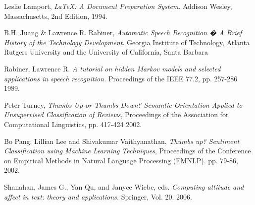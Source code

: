 \documentclass[a4paper,12pt,twoside]{ltxdoc}
\begin{document}
\newpage 

\begin{thebibliography}{9}

  Leslie Lamport,
  \emph{\LaTeX: A Document Preparation System}.
  Addison Wesley, Massachusetts,
  2nd Edition,
  1994.
  
  B.H. Juang \& Lawrence R. Rabiner,
  \emph{Automatic Speech Recognition � A Brief History of the Technology Development}.
  Georgia Institute of Technology, Atlanta
  Rutgers University and the University of California, Santa Barbara
  
Rabiner, Lawrence R.
\emph{A tutorial on hidden Markov models and selected applications in speech recognition.}
Proceedings of the IEEE 77.2,
pp. 257-286
1989.

Peter Turney, 
\emph{Thumbs Up or Thumbs Down? Semantic Orientation Applied to Unsupervised Classification of Reviews},
 Proceedings of the Association for Computational Linguistics,
 pp. 417-424
 2002.

  Bo Pang; Lillian Lee and Shivakumar Vaithyanathan,
  \emph{Thumbs up? Sentiment Classification using Machine Learning Techniques},
  Proceedings of the Conference on Empirical Methods in Natural Language Processing (EMNLP).
  pp. 79-86,
  2002.

  Shanahan, James G., Yan Qu, and Janyce Wiebe, eds.
  \emph{Computing attitude and affect in text: theory and applications.}
  Springer, 
  Vol. 20.
  2006.

\end{thebibliography}
\end{document}
